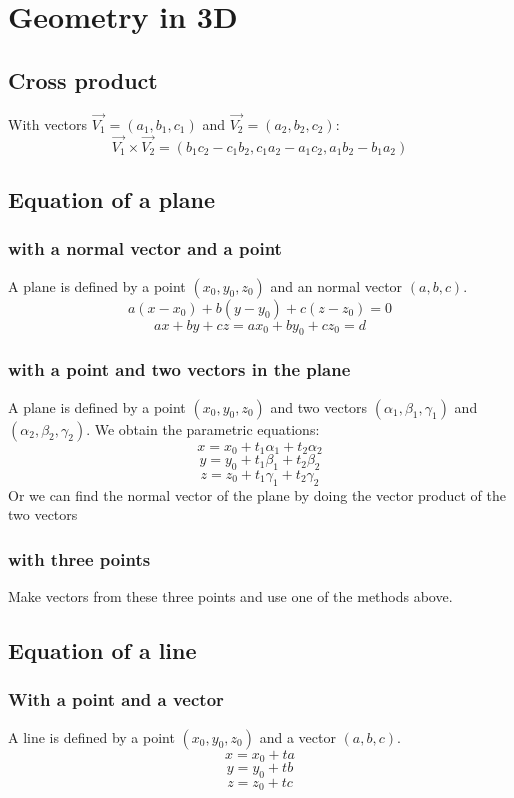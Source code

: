 

%

\section{Geometry in 3D}
\subsection{Cross product}
With vectors $\vec{V_1}=(a_1, b_1, c_1)$ and $\vec{V_2}=(a_2, b_2, c_2)$:
$$\vec{V_1}\times\vec{V_2}=(b_1c_2-c_1b_2, c_1a_2-a_1c_2, a_1b_2-b_1a_2)$$
\subsection{Equation of a plane}
\subsubsection{with a normal vector and a point}
A plane is defined by a point $(x_0, y_0, z_0)$ and an normal vector $(a, b, c)$.
$$a(x-x_0)+b(y-y_0)+c(z-z_0)=0$$
$$ax+by+cz=ax_0+by_0+cz_0=d$$
\subsubsection{with a point and two vectors in the plane}
A plane is defined by a point $(x_0, y_0, z_0)$ and two vectors $(\alpha_1, \beta_1, \gamma_1)$ and $(\alpha_2, \beta_2, \gamma_2)$. We obtain the parametric equations:
$$x=x_0+t_1\alpha_1+t_2\alpha_2$$
$$y=y_0+t_1\beta_1+t_2\beta_2$$
$$z=z_0+t_1\gamma_1+t_2\gamma_2$$
Or we can find the normal vector of the plane by doing the vector product of the two vectors
\subsubsection{with three points}
Make vectors from these three points and use one of the methods above.
\subsection{Equation of a line}
\subsubsection{With a point and a vector}
A line is defined by a point $(x_0, y_0, z_0)$ and a vector $(a, b, c)$.
$$x=x_0+ta$$
$$y=y_0+tb$$
$$z=z_0+tc$$
